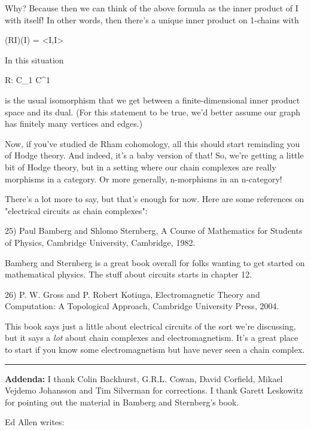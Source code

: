 Why?  Because then we can think of the above formula as the inner
product of I with itself!  In other words, then there's a unique inner
product on 1-chains with

(RI)(I) = <I,I>

In this situation

R: C_{1} \to  C^{1}

is the usual isomorphism that we get between a finite-dimensional
inner product space and its dual.  (For this statement to be true,
we'd better assume our graph has finitely many vertices and edges.)

Now, if you've studied de Rham cohomology, all this should start
reminding you of Hodge theory.  And indeed, it's a baby version
of that!  So, we're getting a little bit of Hodge theory, but in
a setting where our chain complexes are really morphisms in a category.
Or more generally, n-morphisms in an n-category!

There's a lot more to say, but that's enough for now.
Here are some references on "electrical circuits as chain
complexes":

25) Paul Bamberg and Shlomo Sternberg, A Course of Mathematics for
Students of Physics, Cambridge University, Cambridge, 1982.

Bamberg and Sternberg is a great book overall for folks wanting to 
get started on mathematical physics.  The stuff about circuits
starts in chapter 12.  

26) P. W. Gross and P. Robert Kotiuga, Electromagnetic Theory and
Computation: A Topological Approach, Cambridge University Press, 2004.

This book says just a little about electrical circuits of the sort
we're discussing, but it says a \emph{lot} about chain complexes
and electromagnetism.  It's a great place to start if you know some
electromagnetism but have never seen a chain complex.


\par\noindent\rule{\textwidth}{0.4pt}

\textbf{Addenda:} I thank Colin Backhurst, G.R.L. Cowan, David Corfield, Mikael
Vejdemo Johansson and Tim Silverman for corrections.  I thank Garett
Leskowitz for pointing out the material in Bamberg and Sternberg's
book.

Ed Allen writes:

